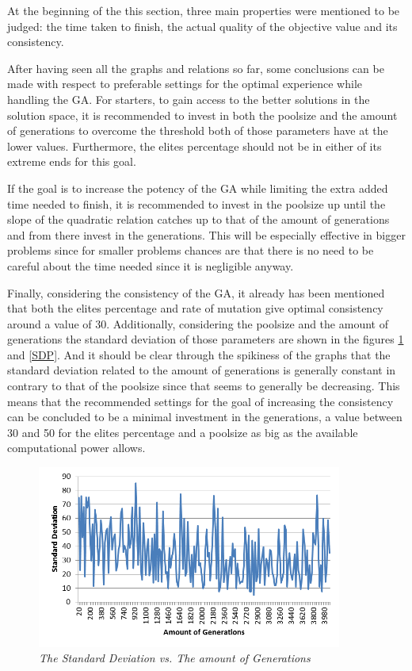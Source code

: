 \par
At the beginning of the this section, three main properties were mentioned to be judged: the time taken to finish, the actual quality of the objective value and its consistency.
\par
After having seen all the graphs and relations so far, some conclusions can be made with respect to preferable settings for the optimal experience while handling the GA.
For starters, to gain access to the better solutions in the solution space, it is recommended to invest in both the poolsize and the amount of generations to overcome the threshold both of those parameters have at the lower values. Furthermore, the elites percentage should not be in either of its extreme ends for this goal.
\par
If the goal is to increase the potency of the GA while limiting the extra added time needed to finish, it is recommended to invest in the poolsize up until the slope of the quadratic relation catches up to that of the amount of generations and from there invest in the generations. This will be especially effective in bigger problems since for smaller problems chances are that there is no need to be careful about the time needed since it is negligible anyway.
\par
Finally, considering the consistency of the GA, it already has been mentioned that both the elites percentage and rate of mutation give optimal consistency around a value of 30. Additionally, considering the poolsize and the amount of generations the standard deviation of those parameters are shown in the figures \ref{SDG} and \ref{SDP}. And it should be clear through the spikiness of the graphs that the standard deviation related to the amount of generations is generally constant in contrary to that of the poolsize since that seems to generally be decreasing. This means that the recommended settings for the goal of increasing the consistency can be concluded to be a minimal investment in the generations, a value between 30 and 50 for the elites percentage and a poolsize as big as the available computational power allows.

\begin{figure}[h] 
	\centering
	\includegraphics[height=6cm]{SDG}
	\caption{\textsl{The Standard Deviation vs. The amount of Generations}}
	\label{SDG}
\end{figure}

